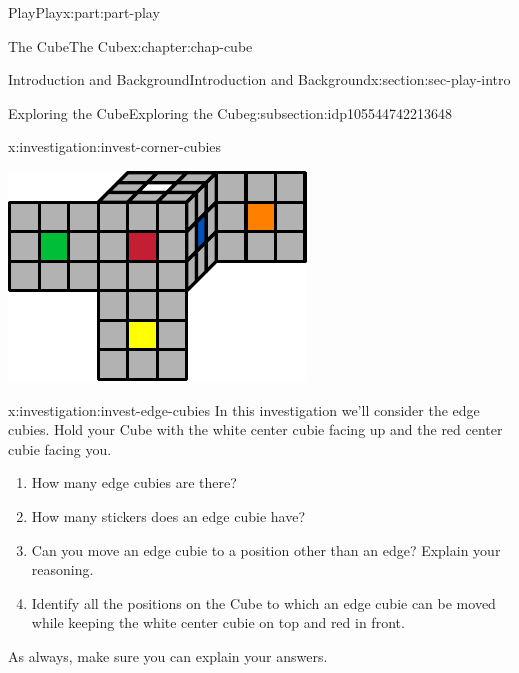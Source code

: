 \documentclass[oneside,10pt,]{book}
\numberwithin{equation}{section}
\begin{document}
\begin{partptx}{Play}{}{Play}{}{}{x:part:part-play}
\begin{chapterptx}{The Cube}{}{The Cube}{}{}{x:chapter:chap-cube}
\begin{sectionptx}{Introduction and Background}{}{Introduction and Background}{}{}{x:section:sec-play-intro}
\begin{subsectionptx}{Exploring the Cube}{}{Exploring the Cube}{}{}{g:subsection:idp105544742213648}
\begin{investigation}{}{x:investigation:invest-corner-cubies}
\begin{image}{0.25}{0.5}{0.25}
\includegraphics[width=\linewidth]{./images/moving_cubies.pdf}
\end{image}%
\end{investigation}%
\begin{investigation}{}{x:investigation:invest-edge-cubies}%
In this investigation we'll consider the edge cubies. Hold your Cube with the white center cubie facing up and the red center cubie facing you.%
\begin{enumerate}
\item{}How many edge cubies are there?%
\item{}How many stickers does an edge cubie have?%
\item{}Can you move an edge cubie to a position other than an edge? Explain your reasoning.%
\item{}Identify all the positions on the Cube to which an edge cubie can be moved while keeping the white center cubie on top and red in front.%
\end{enumerate}
As always, make sure you can explain your answers.%
\begin{image}{0.25}{0.5}{0.25}%

\end{image}
\end{investigation}
\end{subsectionptx}
\end{sectionptx}
\end{chapterptx}
\end{partptx}
\end{document}
